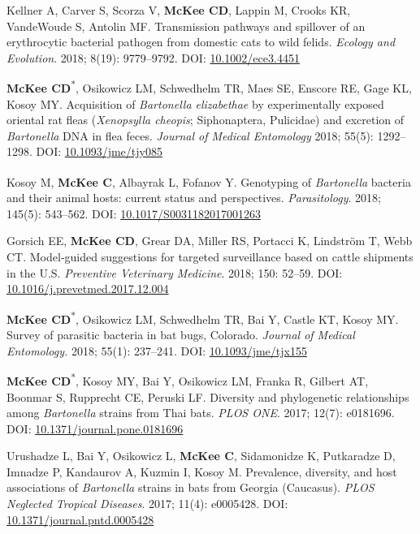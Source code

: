 \documentclass{cv}
\begin{document}
\begin{pubenum}
\item Kellner A, Carver S, Scorza V, \textbf{McKee CD}, Lappin M, Crooks KR, VandeWoude S, Antolin MF. Transmission pathways and spillover of an erythrocytic bacterial pathogen from domestic cats to wild felids. \textit{Ecology and Evolution}. 2018; 8(19): 9779--9792. DOI: \href{https://doi.org/10.1002/ece3.4451}{10.1002/ece3.4451}

\item \textbf{McKee CD}\textsuperscript{*}, Osikowicz LM, Schwedhelm TR, Maes SE, Enscore RE, Gage KL, Kosoy MY. Acquisition of \textit{Bartonella elizabethae} by experimentally exposed oriental rat fleas (\textit{Xenopsylla cheopis}; Siphonaptera, Pulicidae) and excretion of \textit{Bartonella} DNA in flea feces. \textit{Journal of Medical Entomology} 2018; 55(5): 1292--1298. DOI: \href{https://doi.org/10.1093/jme/tjy085}{10.1093/jme/tjy085}

\item Kosoy M\textsuperscript{\dag}, \textbf{McKee C}\textsuperscript{\dag}, Albayrak L, Fofanov Y. Genotyping of \textit{Bartonella} bacteria and their animal hosts: current status and perspectives. \textit{Parasitology}. 2018; 145(5): 543--562. DOI: \href{https://doi.org/10.1017/S0031182017001263}{10.1017/S0031182017001263}

\item Gorsich EE, \textbf{McKee CD}, Grear DA, Miller RS, Portacci K, Lindström T, Webb CT. Model-guided suggestions for targeted surveillance based on cattle shipments in the U.S. \textit{Preventive Veterinary Medicine}. 2018; 150: 52--59. DOI: \href{https://doi.org/10.1016/j.prevetmed.2017.12.004}{10.1016/j.prevetmed.2017.12.004}

\item \textbf{McKee CD}\textsuperscript{*}, Osikowicz LM, Schwedhelm TR, Bai Y, Castle KT, Kosoy MY. Survey of parasitic bacteria in bat bugs, Colorado. \textit{Journal of Medical Entomology.} 2018; 55(1): 237--241. DOI: \href{https://doi.org/10.1093/jme/tjx155}{10.1093/jme/tjx155}

\item \textbf{McKee CD}\textsuperscript{*}, Kosoy MY, Bai Y, Osikowicz LM, Franka R, Gilbert AT, Boonmar S, Rupprecht CE, Peruski LF. Diversity and phylogenetic relationships among \textit{Bartonella} strains from Thai bats. \textit{PLOS ONE}. 2017; 12(7): e0181696. DOI: \href{https://doi.org/10.1371/journal.pone.0181696}{10.1371/journal.pone.0181696}

\item Urushadze L, Bai Y, Osikowicz L, \textbf{McKee C}, Sidamonidze K, Putkaradze D, Imnadze P, Kandaurov A, Kuzmin I, Kosoy M. Prevalence, diversity, and host associations of \textit{Bartonella} strains in bats from Georgia (Caucasus). \textit{PLOS Neglected Tropical Diseases}. 2017; 11(4): e0005428. DOI: \href{https://doi.org/10.1371/journal.pntd.0005428}{10.1371/journal.pntd.0005428}


\end{pubenum}
\end{document}
